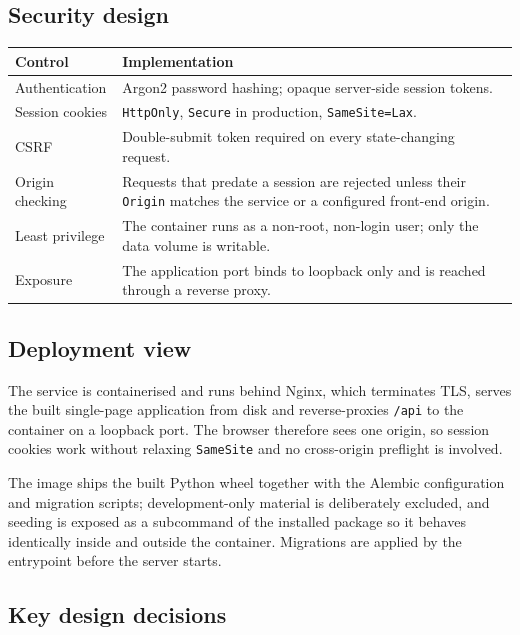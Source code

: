 \subsection{Security design}

\begin{center}
\small
\begin{tabular}{@{}l p{8.6cm}@{}}
\toprule
\textbf{Control} & \textbf{Implementation} \\
\midrule
Authentication  & Argon2 password hashing; opaque server-side session tokens. \\
Session cookies & \texttt{HttpOnly}, \texttt{Secure} in production, \texttt{SameSite=Lax}. \\
CSRF            & Double-submit token required on every state-changing request. \\
Origin checking & Requests that predate a session are rejected unless their \texttt{Origin} matches the service or a configured front-end origin. \\
Least privilege & The container runs as a non-root, non-login user; only the data volume is writable. \\
Exposure        & The application port binds to loopback only and is reached through a reverse proxy. \\
\bottomrule
\end{tabular}
\end{center}

\subsection{Deployment view}

The service is containerised and runs behind Nginx, which terminates TLS, serves the built
single-page application from disk and reverse-proxies \texttt{/api} to the container on a
loopback port. The browser therefore sees one origin, so session cookies work without
relaxing \texttt{SameSite} and no cross-origin preflight is involved.

The image ships the built Python wheel together with the Alembic configuration and
migration scripts; development-only material is deliberately excluded, and seeding is
exposed as a subcommand of the installed package so it behaves identically inside and
outside the container. Migrations are applied by the entrypoint before the server starts.

\subsection{Key design decisions}

